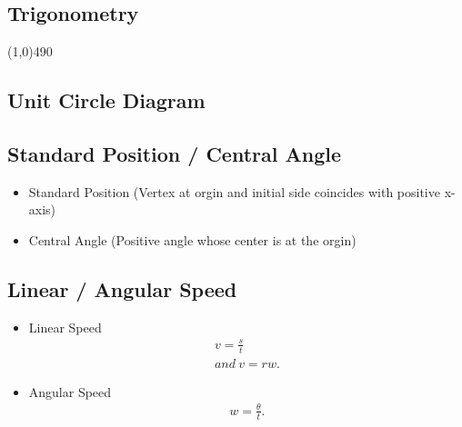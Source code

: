 \documentclass{report}
\begin{document}
      \pagebreak \bigbreak \noindent
      \begin{center}
        \section{\Large{Trigonometry}}
      \end{center}
      \line(1,0){490}
      
      \bigbreak \noindent \bigbreak \noindent 
      \subsection{Unit Circle Diagram}
      \begin{figure}[ht]
          \centering
          \def\svgwidth{\columnwidth}
          \label{fig:unitcirce}
      \end{figure}

      \pagebreak \bigbreak \noindent
      \subsection{Standard Position / Central Angle}
      \begin{itemize}
        \item Standard Position (Vertex at orgin and initial side coincides with positive x-axis)
        \item Central Angle (Positive angle whose center is at the orgin)
      \end{itemize}

        \bigbreak \noindent \bigbreak \noindent 
        \subsection{
          Linear / Angular Speed
        }
        \begin{itemize}
        \item Linear Speed
          \begin{align*}
            v = \frac{s}{t} \\
            and\ 
            v = rw
          .\end{align*}
        \item Angular Speed
          \begin{align*}
            w = \frac{\theta}{t}            
          .\end{align*}
        \end{itemize}
\end{document}
